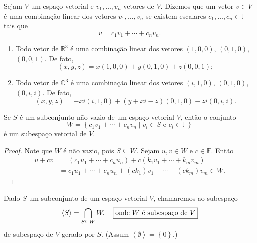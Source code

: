 \begin{definition}
	Sejam $V$ um espaço vetorial e $v_{1},\dotsc,v_{n}$ vetores de $V$.
	Dizemos que um vetor $v\in V$ é uma combinação linear dos vetores
	$v_{1},\dotsc,v_{n}$ se existem escalares
	$c_{1},\dotsc,c_{n}\in\mathbb{F}$ tais que
	\[ v=c_{1}v_{1}+\dotsb+c_{n}v_{n}. \]
\end{definition}

\begin{example}
	\begin{enumerate}\leavevmode
		\item Todo vetor de $\mathbb{R}^{3}$ é uma combinação linear dos
		      vetores $\left(1,0,0\right)$, $\left(0,1,0\right)$, $\left(0,0,1\right)$.
		      De fato,
		      \[
			      \left(x,y,z\right)=
			      x\left(1,0,0\right)+
			      y\left(0,1,0\right)+
			      z\left(0,0,1\right);
		      \]
		\item Todo vetor de $\mathbb{C}^{3}$ é uma combinação linear
		      dos vetores $\left(i,1,0\right)$, $\left(0,1,0\right)$, $\left(0,i,i\right)$.
		      De fato,
		      \[
			      \left(x,y,z\right)=
			      -xi\left(i,1,0\right)+
			      \left(y+xi-z\right)\left(0,1,0\right)-
			      zi\left(0,i,i\right).
		      \]
	\end{enumerate}
\end{example}

\begin{proposition}
Se $S$ é um subconjunto não vazio de um espaço vetorial $V$, então
o conjunto
\[
	W=
	\left\{
	c_{1}v_{1}+\dotsb+c_{n}v_{n}
	\mid v_{i}\in S
	\text{ e }
	c_{i}\in\mathbb{F}
	\right\}
\]
é um subespaço vetorial de $V$.
\end{proposition}

\begin{proof}
	Note que $W$ é não vazio, pois $S\subseteq W$.
	Sejam $u,v\in W$ e $c\in\mathbb{F}$.
	Então
	\begin{align*}
		u+cv
		 & =
		\left(
		c_{1}u_{1}+
		\dotsb+
		c_{n}u_{n}
		\right)+
		c\left(k_{1}v_{1}+\dotsb+k_{m}v_{m}\right)= \\
		 & =
		c_{1}u_{1}+
		\dotsb+
		c_{n}u_{n}+
		\left(ck_{1}\right)v_{1}+
		\dotsb+
		\left(ck_{m}\right)v_{m}
		\in W.
	\end{align*}
\end{proof}

\begin{definition}
	Dado $S$ um subconjunto de um espaço vetorial $V$, chamaremos ao subespaço
	\[
		\left\langle S\right\rangle=
		\bigcap_{S\subseteq W}W,\quad
		\fbox{onde $W$ é subespaço de $V$}
	\]
	de subespaço de $V$ gerado por $S$.
	(Assum $	\left\langle \emptyset\right\rangle=\left\{0\right\}$.)
\end{definition}

